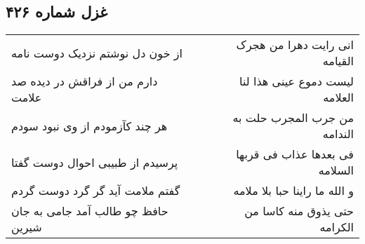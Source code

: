 \begin{center}
\section*{غزل شماره ۴۲۶}
\label{sec:sh426}
\begin{longtable}{l p{0.5cm} r}
از خون دل نوشتم نزدیک دوست نامه
&&
انی رایت دهرا من هجرک القیامه
\\
دارم من از فراقش در دیده صد علامت
&&
لیست دموع عینی هذا لنا العلامه
\\
هر چند کآزمودم از وی نبود سودم
&&
من جرب المجرب حلت به الندامه
\\
پرسیدم از طبیبی احوال دوست گفتا
&&
فی بعدها عذاب فی قربها السلامه
\\
گفتم ملامت آید گر گرد دوست گردم
&&
و الله ما راینا حبا بلا ملامه
\\
حافظ چو طالب آمد جامی به جان شیرین
&&
حتی یذوق منه کاسا من الکرامه
\\
\end{longtable}
\end{center}
